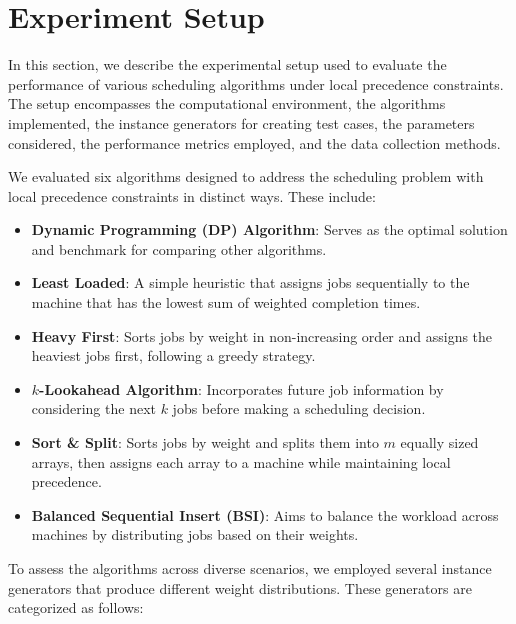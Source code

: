 \section{Experiment Setup} \label{sec:experiment_setup}

In this section, we describe the experimental setup used to evaluate the performance of various scheduling algorithms under local precedence constraints. The setup encompasses the computational environment, the algorithms implemented, the instance generators for creating test cases, the parameters considered, the performance metrics employed, and the data collection methods.

We evaluated six algorithms designed to address the scheduling problem with local precedence constraints in distinct ways. These include:

\begin{itemize}
    \item \textbf{Dynamic Programming (DP) Algorithm}: Serves as the optimal solution and benchmark for comparing other algorithms.
    \item \textbf{Least Loaded}: A simple heuristic that assigns jobs sequentially to the machine that has the lowest sum of weighted completion times.
    \item \textbf{Heavy First}: Sorts jobs by weight in non-increasing order and assigns the heaviest jobs first, following a greedy strategy.
    \item \textbf{$k$-Lookahead Algorithm}: Incorporates future job information by considering the next $k$ jobs before making a scheduling decision.
    \item \textbf{Sort \& Split}: Sorts jobs by weight and splits them into $m$ equally sized arrays, then assigns each array to a machine while maintaining local precedence.
    \item \textbf{Balanced Sequential Insert (BSI)}: Aims to balance the workload across machines by distributing jobs based on their weights.
\end{itemize}

To assess the algorithms across diverse scenarios, we employed several instance generators that produce different weight distributions. These generators are categorized as follows:



